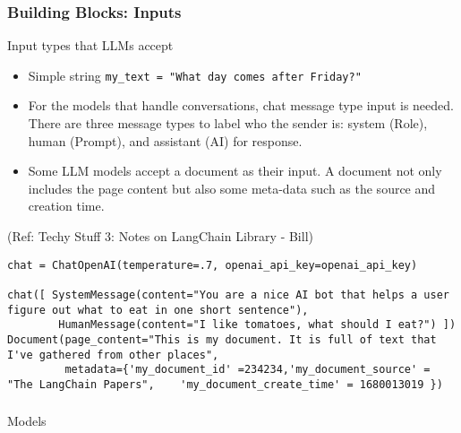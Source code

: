 \begin{frame}[fragile]\frametitle{Building Blocks: Inputs}

Input types that LLMs accept

\begin{itemize}
\item Simple string \lstinline|my_text = "What day comes after Friday?"|
\item For the models that handle conversations, chat message type input is needed. There are three message types to label who the sender is: system (Role), human (Prompt), and assistant (AI) for response.
\item Some LLM models accept a document as their input. A document not only includes the page content but also some meta-data such as the source and creation time.
\end{itemize}

{\tiny (Ref: Techy Stuff 3: Notes on LangChain Library - Bill)}

\begin{lstlisting}
chat = ChatOpenAI(temperature=.7, openai_api_key=openai_api_key)

chat([ SystemMessage(content="You are a nice AI bot that helps a user figure out what to eat in one short sentence"),
        HumanMessage(content="I like tomatoes, what should I eat?") ])
Document(page_content="This is my document. It is full of text that I've gathered from other places",
         metadata={'my_document_id' =234234,'my_document_source' = "The LangChain Papers",    'my_document_create_time' = 1680013019 })
\end{lstlisting}	  


\end{frame}


\begin{frame}[fragile]\frametitle{}
\begin{center}
{\Large Models}
\end{center}
\end{frame}

